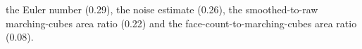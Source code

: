 the Euler number (0.29), the noise estimate (0.26), the smoothed-to-raw marching-cubes area ratio (0.22) and the face-count-to-marching-cubes area ratio (0.08).
